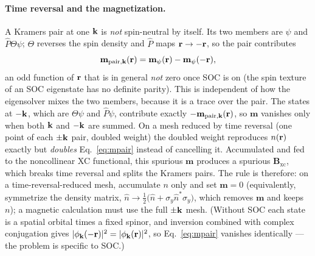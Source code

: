\paragraph{Time reversal and the magnetization.} A Kramers pair at one
$\mathbf{k}$ is \emph{not} spin-neutral by itself. Its two members are $\psi$ and
$\hat P\Theta\psi$; $\Theta$ reverses the spin density and $\hat P$ maps
$\mathbf{r}\to-\mathbf{r}$, so the pair contributes
\begin{equation}
\mathbf m_{\mathrm{pair},\mathbf{k}}(\mathbf{r}) = \mathbf m_\psi(\mathbf{r}) - \mathbf m_\psi(-\mathbf{r}),
\label{eq:mpair}
\end{equation}
an odd function of $\mathbf{r}$ that is in general \emph{not} zero once SOC is on
(the spin texture of an SOC eigenstate has no definite parity). This is
independent of how the eigensolver mixes the two members, because it is a
trace over the pair. The states at $-\mathbf{k}$, which are $\Theta\psi$ and
$\hat P\psi$, contribute exactly $-\mathbf m_{\mathrm{pair},\mathbf{k}}(\mathbf{r})$, so
$\mathbf m$ vanishes only when both $\mathbf{k}$ and $-\mathbf{k}$ are summed. On a mesh
reduced by time reversal (one point of each $\pm\mathbf{k}$ pair, doubled weight)
the doubled weight reproduces $n(\mathbf{r})$ exactly but \emph{doubles}
Eq.~\eqref{eq:mpair} instead of cancelling it. Accumulated and fed to the
noncollinear XC functional, this spurious $\mathbf m$ produces a spurious
$\mathbf B_{\mathrm{xc}}$, which breaks time reversal and splits the
Kramers pairs. The rule is therefore: on a time-reversal-reduced mesh,
accumulate $n$ only and set $\mathbf m = 0$ (equivalently, symmetrize the
density matrix, $\hat n \to \tfrac12\big(\hat n + \sigma_y \hat n^{*}
\sigma_y\big)$, which removes $\mathbf m$ and keeps $n$); a magnetic
calculation must use the full $\pm\mathbf{k}$ mesh. (Without SOC each state is a
spatial orbital times a fixed spinor, and inversion combined with complex
conjugation gives $|\phi_{\mathbf{k}}(-\mathbf{r})|^2 = |\phi_{\mathbf{k}}(\mathbf{r})|^2$, so
Eq.~\eqref{eq:mpair} vanishes identically --- the problem is specific to
SOC.)

